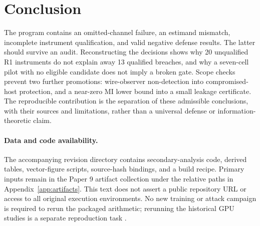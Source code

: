 \section{Conclusion}

The program contains an omitted-channel failure, an estimand mismatch,
incomplete instrument qualification, and valid negative defense results.
The latter should survive an audit. Reconstructing the decisions shows why
20 unqualified R1 instruments do not explain away 13 qualified breaches,
and why a seven-cell pilot with no eligible candidate does not imply a
broken gate. Scope checks prevent two further promotions: wire-observer
non-detection into compromised-host protection, and a near-zero MI lower
bound into a small leakage certificate. The reproducible contribution is
the separation of these admissible conclusions, with their sources and
limitations, rather than a universal defense or information-theoretic claim.

\paragraph{Data and code availability.}
The accompanying revision directory contains secondary-analysis code,
derived tables, vector-figure scripts, source-hash bindings, and a build
recipe. Primary inputs remain in the Paper 9 artifact collection under
the relative paths in Appendix~\ref{app:artifacts}. This text does not
assert a public repository URL or access to all original execution
environments. No new training or attack campaign is required to rerun the
packaged arithmetic; rerunning the historical GPU studies is a separate
reproduction task \citep{artifacts2026}.
